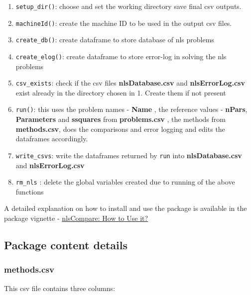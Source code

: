 \begin{enumerate}
\def\labelenumi{\arabic{enumi}.}
\tightlist
\item
  \texttt{setup\_dir()}: choose and set the working directory save final
  csv outputs.
\item
  \texttt{machineId()}: create the machine ID to be used in the output
  csv files.
\item
  \texttt{create\_db()}: create dataframe to store database of nls
  problems
\item
  \texttt{create\_elog()}: create dataframe to store error-log in
  solving the nls problems
\item
  \texttt{csv\_exists}: check if the csv files \textbf{nlsDatabase.csv}
  and \textbf{nlsErrorLog.csv} exist already in the directory chosen in
  1. Create them if not present
\item
  \texttt{run()}: this uses the problem names - \textbf{Name} , the
  reference values - \textbf{nPars}, \textbf{Parameters} and
  \textbf{ssquares} from \textbf{problems.csv} , the methods from
  \textbf{methods.csv}, does the comparisons and error logging and edits
  the dataframes accordingly.
\item
  \texttt{write\_csvs}: write the dataframes returned by \texttt{run}
  into \textbf{nlsDatabase.csv} and \textbf{nlsErrorLog.csv}
\item
  \texttt{rm\_nls} : delete the global variables created due to running
  of the above functions
\end{enumerate}

A detailed explanation on how to install and use the package is
available in the package vignette -
\href{https://github.com/ArkaB-DS/nlsCompare/blob/master/inst/docs/nlsCompare-Usage.pdf}{nlsCompare:
How to Use it?}

\hypertarget{package-content-details}{%
\subsection{Package content details}\label{package-content-details}}

\hypertarget{methods.csv}{%
\subsubsection{methods.csv}\label{methods.csv}}

This csv file contains three columns:

